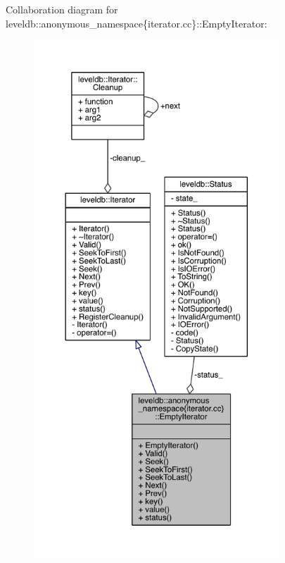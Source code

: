 Collaboration diagram for leveldb\+:\+:anonymous\+\_\+namespace\{iterator.\+cc\}\+:\+:Empty\+Iterator\+:
\nopagebreak
\begin{figure}[H]
\begin{center}
\leavevmode
\includegraphics[height=550pt]{classleveldb_1_1anonymous__namespace_02iterator_8cc_03_1_1_empty_iterator__coll__graph}
\end{center}
\end{figure}
